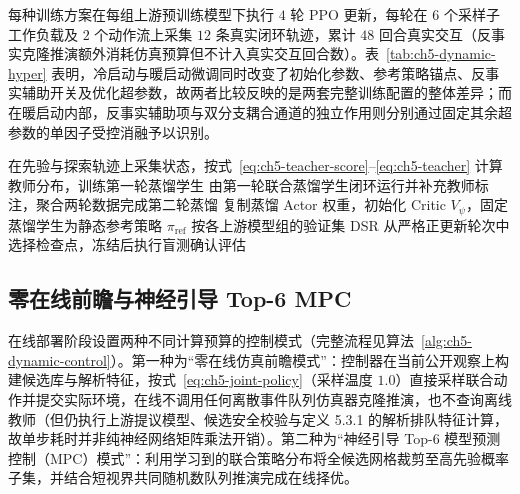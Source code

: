 每种训练方案在每组上游预训练模型下执行 $4$ 轮 PPO 更新，每轮在 $6$ 个采样子工作负载及 $2$ 个动作流上采集 $12$ 条真实闭环轨迹，累计 $48$ 回合真实交互（反事实克隆推演额外消耗仿真预算但不计入真实交互回合数）。表~\ref{tab:ch5-dynamic-hyper} 表明，冷启动与暖启动微调同时改变了初始化参数、参考策略锚点、反事实辅助开关及优化超参数，故两者比较反映的是两套完整训练配置的整体差异；而在暖启动内部，反事实辅助项与双分支耦合通道的独立作用则分别通过固定其余超参数的单因子受控消融予以识别。

\begin{algorithm}[!htbp]
\caption{规划蒸馏与环境交互、反事实辅助 PPO 微调}
\label{alg:ch5-dynamic-training}
在先验与探索轨迹上采集状态，按式~\eqref{eq:ch5-teacher-score}--\eqref{eq:ch5-teacher} 计算教师分布，训练第一轮蒸馏学生\;
由第一轮联合蒸馏学生闭环运行并补充教师标注，聚合两轮数据完成第二轮蒸馏\;
复制蒸馏 Actor 权重，初始化 Critic $V_\psi$，固定蒸馏学生为静态参考策略 $\pi_{\mathrm{ref}}$\;
按各上游模型组的验证集 DSR 从严格正更新轮次中选择检查点，冻结后执行盲测确认评估\;
\end{algorithm}

\subsection{零在线前瞻与神经引导 Top-6 MPC}

在线部署阶段设置两种不同计算预算的控制模式（完整流程见算法~\ref{alg:ch5-dynamic-control}）。第一种为“零在线仿真前瞻模式”：控制器在当前公开观察上构建候选库与解析特征，按式~\eqref{eq:ch5-joint-policy}（采样温度 $1.0$）直接采样联合动作并提交实际环境，在线不调用任何离散事件队列仿真器克隆推演，也不查询离线教师（但仍执行上游提议模型、候选安全校验与定义 5.3.1 的解析排队特征计算，故单步耗时并非纯神经网络矩阵乘法开销）。第二种为“神经引导 Top-6 模型预测控制（MPC）模式”\cite{hewing2020learning}：利用学习到的联合策略分布将全候选网格裁剪至高先验概率子集，并结合短视界共同随机数队列推演完成在线择优。

